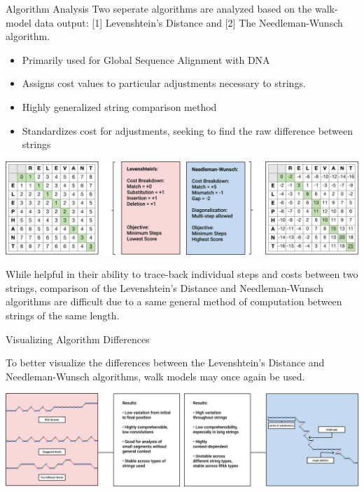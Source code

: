 \documentclass[final]{beamer}
\newlength{\colwidth}
\begin{document}
\begin{frame}[t]
\begin{columns}[t]
\begin{column}{\colwidth}
\begin{block}{Algorithm Analysis}
    Two seperate algorithms are analyzed based on the walk-model data output: [1] Levenshtein’s Distance and [2] The Needleman-Wunsch algorithm. 

   


    \begin{itemize}
      \item Primarily used for Global Sequence Alignment with DNA
      \item Assigns cost values to particular adjustments necessary to strings.
    \end{itemize}


    \begin{itemize}
      \item Highly generalized string comparison method
      \item Standardizes cost for adjustments, seeking to find the raw difference between strings
    \end{itemize}
    \vspace{0.2 in}
    \includegraphics[width = \textwidth]{AlgComparison.pdf}
    
    While helpful in their ability to trace-back individual steps and costs between two strings, comparison of the Levenshtein's Distance and Needleman-Wunsch algorithms are difficult due to a same general method of computation between strings of the same length.
     
    \end{block}
    
    \begin{block}{Visualizing Algorithm Differences}
    
    To better visualize the differences between the Levenshtein's Distance and Needleman-Wunsch algorithms, walk models may once again be used. 
    \vspace{0.2 in}
    \begin{center}
    \includegraphics[width = \textwidth]{AlgWalks.pdf}
    \end{center}
    

\end{block}
\end{column}
\end{columns}
\end{frame}
\end{document}
